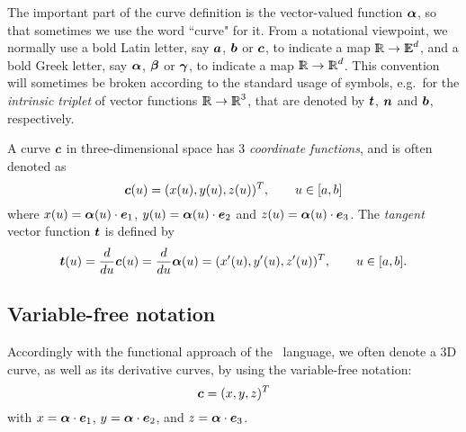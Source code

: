 \documentclass{31x47jw}
\begin{document}
The important part of the curve definition is the vector-valued
function ${{\mbox{\boldmath $\alpha$}}}$, so that sometimes we use the word ``curve" for
it.  From a notational viewpoint, we normally use a bold Latin letter,
say ${\mbox{\boldmath $a$}}$, ${\mbox{\boldmath $b$}}$ or ${\mbox{\boldmath $c$}}$, to indicate a map $\mathbb{I\!\!R} \rightarrow
\mathbb{I\!\!E}^d$, and a bold Greek letter, say ${\mbox{\boldmath $\alpha$}}$, ${\mbox{\boldmath $\beta$}}$ or
${\mbox{\boldmath $\gamma$}}$, to indicate a map $\mathbb{I\!\!R} \rightarrow \mathbb{I\!\!R}^d$.  This
convention will sometimes be  broken according to the standard usage of
symbols, e.g.~for the \emph{intrinsic triplet} of vector functions
$\mathbb{I\!\!R}\rightarrow\mathbb{I\!\!R}^{3}$, that are denoted by ${\mbox{\boldmath $t$}}$, ${\mbox{\boldmath $n$}}$ and
${\mbox{\boldmath $b$}}$, respectively.

\begin{example}[3D curve]

A curve ${\mbox{\boldmath $c$}}$ in three-dimensional space has 3 \emph{coordinate
functions}, and is often denoted as
\[
{\mbox{\boldmath $c$}}(u) = (x(u),  y(u), z(u))^T,
\qquad u\in [a,b]
\]
where ${x}(u) = {\mbox{\boldmath $\alpha$}}(u) \cdot {\mbox{\boldmath $e$}}_{1}$, ${y}(u) =
{\mbox{\boldmath $\alpha$}}(u) \cdot {\mbox{\boldmath $e$}}_{2}$ and ${z}(u) = {\mbox{\boldmath $\alpha$}}(u) \cdot
{\mbox{\boldmath $e$}}_{3}$.  The \emph{tangent} vector function ${\mbox{\boldmath $t$}}$ is defined
by
\[
{\mbox{\boldmath $t$}}(u) = {d  \over d u} {\mbox{\boldmath $c$}}(u) = {d  \over d u} {\mbox{\boldmath $\alpha$}}(u) =
(x'(u), y'(u), z'(u))^T, \qquad u\in [a,b].
\]

\end{example}


% 
% 
%   
% 



\subsection{Variable-free notation}
\label{sec:5:free}

Accordingly with the functional approach of the \pl\ language, we
often denote a 3D curve, as well as its derivative curves, by using
the variable-free notation:
\[
{\mbox{\boldmath $c$}} = (x,  y, z)^T
\]
with ${x} = {\mbox{\boldmath $\alpha$}} \cdot {\mbox{\boldmath $e$}}_{1}$, ${y} = {\mbox{\boldmath $\alpha$}} \cdot
{\mbox{\boldmath $e$}}_{2}$, and ${z} = {\mbox{\boldmath $\alpha$}} \cdot {\mbox{\boldmath $e$}}_{3}$.%
\end{document}
